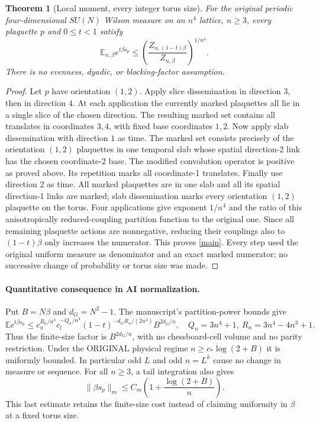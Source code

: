 \documentclass[11pt]{article}
\newtheorem{theorem}{Theorem}
\newcommand{\E}{\mathbb E}
\begin{document}
\begin{theorem}[Local moment, every integer torus size]
For the original periodic four-dimensional $SU(N)$ Wilson measure on an $n^4$ lattice,
$n\ge3$, every plaquette $p$ and $0\le t<1$ satisfy
\begin{equation}\label{main}
 \E_{n,\beta}e^{t\beta s_p}
 \le\left(\frac{Z_{n,(1-t)\beta}}{Z_{n,\beta}}\right)^{1/n^4}.
\end{equation}
There is no evenness, dyadic, or blocking-factor assumption.
\end{theorem}
\begin{proof}
Let $p$ have orientation $(1,2)$. Apply slice dissemination in direction $3$, then in
direction $4$. At each application the currently marked plaquettes all lie in a single
slice of the chosen direction. The resulting marked set contains all translates in
coordinates $3,4$, with fixed base coordinates $1,2$.
Now apply slab dissemination with direction $1$ as time. The marked set consists precisely
of the orientation $(1,2)$ plaquettes in one temporal slab whose spatial direction-2 link
has the chosen coordinate-2 base. The modified convolution operator is positive as proved
above. Its repetition marks all coordinate-1 translates.
Finally use direction $2$ as time. All marked plaquettes are in one slab and all its
spatial direction-1 links are marked; slab dissemination marks every orientation $(1,2)$
plaquette on the torus. Four applications give exponent $1/n^4$ and the ratio of this
anisotropically reduced-coupling partition function to the original one.
Since all remaining plaquette actions are nonnegative, reducing their couplings also to
$(1-t)\beta$ only increases the numerator. This proves \eqref{main}.
Every step used the original uniform measure as denominator and an exact marked numerator;
no successive change of probability or torus size was made.
\end{proof}

\paragraph{Quantitative consequence in AI normalization.}
Put $B=N\beta$ and $d_G=N^2-1$. The manuscript's partition-power bounds give
\[
 \E e^{t\beta s_p}\le
 c_u^{R_n/n^4}c_l^{-Q_n/n^4}(1-t)^{-d_GR_n/(2n^4)}B^{2d_G/n},
 \quad Q_n=3n^4+1,\ R_n=3n^4-4n^3+1.
\]
Thus the finite-size factor is $B^{2d_G/n}$, with no chessboard-cell volume and no parity
restriction. Under the ORIGINAL physical regime $n\ge c_*\log(2+B)$ it is uniformly
bounded. In particular odd $L$ and odd $n=L^k$ cause no change in measure or sequence.
For all $n\ge3$, a tail integration also gives
\[
 \|\beta s_p\|_m\le C_m\left(1+\frac{\log(2+B)}n\right).
\]
This last estimate retains the finite-size cost instead of claiming uniformity in $\beta$
at a fixed torus size.
\end{document}
